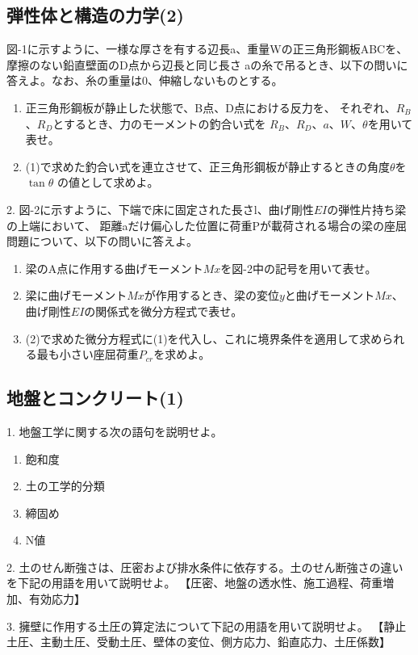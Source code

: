 \subsection{弾性体と構造の力学(2)}
図-1に示すように、一様な厚さを有する辺長a、重量Wの正三角形鋼板ABCを、摩擦のない鉛直壁面のD点から辺長と同じ長さ
aの糸で吊るとき、以下の問いに答えよ。なお、糸の重量は0、伸縮しないものとする。

\begin{enumerate}
  \item 正三角形鋼板が静止した状態で、B点、D点における反力を、
        それぞれ、$R_B$、$R_D$とするとき、力のモーメントの釣合い式を
        $R_B$、$R_D$、$a$、$W$、$\theta$を用いて表せ。
  \item (1)で求めた釣合い式を連立させて、正三角形鋼板が静止するときの角度$\theta$を$\tan\theta$
        の値として求めよ。
\end{enumerate}

2.
図-2に示すように、下端で床に固定された長さl、曲げ剛性$EI$の弾性片持ち梁の上端において、
距離aだけ偏心した位置に荷重Pが載荷される場合の梁の座屈問題について、以下の問いに答えよ。

\begin{enumerate}[(1)]
  \item 梁のA点に作用する曲げモーメント$Mx$を図-2中の記号を用いて表せ。
  \item 梁に曲げモーメント$Mx$が作用するとき、梁の変位$y$と曲げモーメント$Mx$、曲げ剛性$EI$の関係式を微分方程式で表せ。
  \item (2)で求めた微分方程式に(1)を代入し、これに境界条件を適用して求められる最も小さい座屈荷重$P_{cr}$を求めよ。
\end{enumerate}

\subsection{地盤とコンクリート(1)}
1.
地盤工学に関する次の語句を説明せよ。
\begin{enumerate}[(1)]
  \item 飽和度
  \item 土の工学的分類
  \item 締固め
  \item N値
\end{enumerate}

2.
土のせん断強さは、圧密および排水条件に依存する。土のせん断強さの違いを下記の用語を用いて説明せよ。
【圧密、地盤の透水性、施工過程、荷重増加、有効応力】

3.
擁壁に作用する土圧の算定法について下記の用語を用いて説明せよ。
【静止土圧、主動土圧、受動土圧、壁体の変位、側方応力、鉛直応力、土圧係数】

